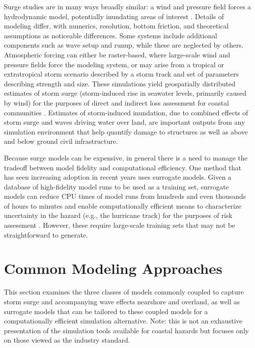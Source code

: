 Surge studies are in many ways broadly similar: a wind and pressure field forces a hydrodynamic model, potentially inundating areas of interest \citep{njcoast2018implementation}. Details of modeling differ, with numerics, resolution, bottom friction, and theoretical assumptions as noticeable differences. Some systems include additional components such as wave setup and runup, while these are neglected by others. Atmospheric forcing can either be raster-based, where large-scale wind and pressure fields force the modeling system, or may arise from a tropical or extratropical storm scenario described by a storm track and set of parameters describing strength and size. These simulations yield geospatially distributed estimates of storm surge (storm-induced rise in seawater levels, primarily caused by wind) for the purposes of direct and indirect loss assessment for coastal communities \citep{jacob2011responding}. Estimates of storm-induced inundation, due to combined effects of storm surge and waves driving water over land, are important outputs from any simulation environment that help quantify damage to structures as well as above and below ground civil infrastructure.

Because surge models can be expensive, in general there is a need to manage the tradeoff between model fidelity and computational efficiency. One method that has seen increasing adoption in recent years uses surrogate models. Given a database of high-fidelity model runs to be used as a training set, surrogate models can reduce CPU times of model runs from hundreds and even thousands of hours to minutes and enable computationally efficient means to characterize uncertainty in the hazard (e.g., the hurricane track) for the purposes of risk assessment \citep{kijewski-correa2014cybereye}. However, these require large-scale training sets that may not be straightforward to generate. 

\section{Common Modeling Approaches}
\label{sec:storm_surge_methods}

This section examines the three classes of models commonly coupled to capture storm surge and accompanying wave effects nearshore and overland, as well as surrogate models that can be tailored to these coupled models for a computationally efficient simulation alternative. Note: this is not an exhaustive presentation of the simulation tools available for coastal hazards but focuses only on those viewed as the industry standard. 

